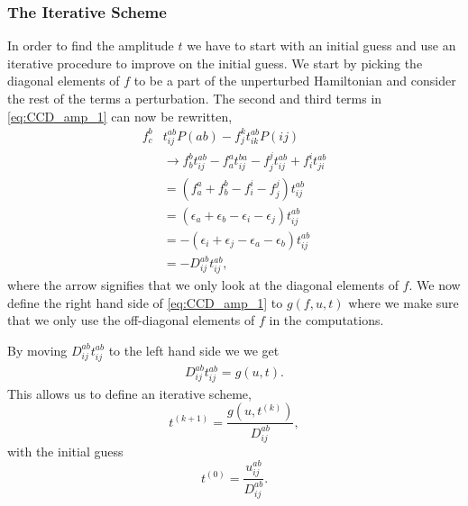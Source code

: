 \documentclass[
    a4paper, aps, twocolumn, floatfix, superscriptaddress,
    nofootinbib]{revtex4-1}
\newcommand{\1}{\mathds{1}}
\begin{document}
        \subsubsection{The Iterative Scheme}
            In order to find the amplitude $t$ we have to start with an initial
            guess and use an iterative procedure to improve on the initial
            guess. We start by picking the diagonal elements of $f$ to be a part
            of the unperturbed Hamiltonian and consider the rest of the terms a
            perturbation. The second and third terms in \autoref{eq:CCD_amp_1}
            can now be rewritten,
            \begin{equation}
            \begin{aligned}
                f^b_c&t_{ij}^{ab}P(ab) - f^k_j t_{ik}^{ab}P(ij) \\
                    &\to f^b_bt_{ij}^{ab} - f^a_at_{ij}^{ba}
                    - f^j_jt_{ij}^{ab} + f^i_it_{ji}^{ab} \\
                    &= (f^a_a + f^b_b - f^i_i - f^j_j)t_{ij}^{ab} \\
                    &= (\epsilon_a + \epsilon_b - \epsilon_i
                    - \epsilon_j)t_{ij}^{ab} \\
                    &= -(\epsilon_i + \epsilon_j - \epsilon_a
                    - \epsilon_b)t_{ij}^{ab} \\
                    &= -D_{ij}^{ab}t_{ij}^{ab},
            \end{aligned}
            \end{equation}
            where the arrow signifies that we only look at the diagonal elements
            of $f$. We now define the right hand side of \autoref{eq:CCD_amp_1}
            to $g(f, u, t)$ where we make sure that we only use the off-diagonal
            elements of $f$ in the computations.

            By moving $D^{ab}_{ij}t^{ab}_{ij}$ to the left hand side we we get
            \begin{align}
                D_{ij}^{ab}t_{ij}^{ab} = g(u, t).
            \end{align}
            This allows us to define an iterative scheme,
            \begin{equation}
                t^{(k + 1)} = \frac{g(u, t^{(k)})}{D_{ij}^{ab}},
                \label{eq:iterative_amplitude}
            \end{equation}
            with the initial guess
            \begin{equation}
                t^{(0)} = \frac{u_{ij}^{ab}}{D_{ij}^{ab}}.
            \end{equation}
\end{document}
